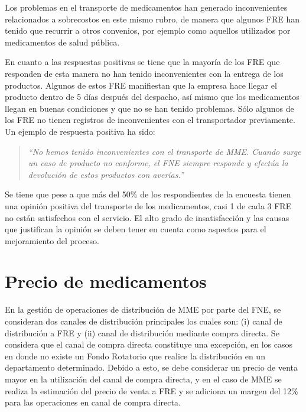 \documentclass[
]{book}
\begin{document}
Los problemas en el transporte de medicamentos han generado inconvenientes relacionados a sobrecostos en este mismo rubro, de manera que algunos FRE han tenido que recurrir a otros convenios, por ejemplo como aquellos utilizados por medicamentos de salud pública.

En cuanto a las respuestas positivas se tiene que la mayoría de los FRE que responden de esta manera no han tenido inconvenientes con la entrega de los productos. Algunos de estos FRE manifiestan que la empresa hace llegar el producto dentro de 5 días después del despacho, así mismo que los medicamentos llegan en buenas condiciones y que no se han tenido problemas. Sólo algunos de los FRE no tienen registros de inconvenientes con el transportador previamente. Un ejemplo de respuesta positiva ha sido:

\begin{quote}
\emph{``No hemos tenido inconvenientes con el transporte de MME. Cuando surge un caso de producto no conforme, el FNE siempre responde y efectúa la devolución de estos productos con averías.''}
\end{quote}

Se tiene que pese a que más del 50\% de los respondientes de la encuesta tienen una opinión positiva del transporte de los medicamentos, casi 1 de cada 3 FRE no están satisfechos con el servicio. El alto grado de insatisfacción y las causas que justifican la opinión se deben tener en cuenta como aspectos para el mejoramiento del proceso.

\hypertarget{precio-de-medicamentos}{%
\section{Precio de medicamentos}\label{precio-de-medicamentos}}


En la gestión de operaciones de distribución de MME por parte del FNE, se consideran dos canales de distribución principales los cuales son: (i) canal de distribución a FRE y (ii) canal de distribución mediante compra directa. Se considera que el canal de compra directa constituye una excepción, en los casos en donde no existe un Fondo Rotatorio que realice la distribución en un departamento determinado. Debido a esto, se debe considerar un precio de venta mayor en la utilización del canal de compra directa, y en el caso de MME se realiza la estimación del precio de venta a FRE y se adiciona un margen del 12\% para las operaciones en canal de compra directa.
\end{document}
